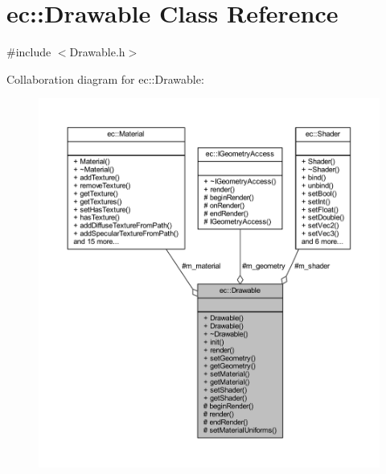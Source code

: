 \hypertarget{classec_1_1_drawable}{}\section{ec\+:\+:Drawable Class Reference}
\label{classec_1_1_drawable}


{\ttfamily \#include $<$Drawable.\+h$>$}



Collaboration diagram for ec\+:\+:Drawable\+:\nopagebreak
\begin{figure}[H]
\begin{center}
\leavevmode
\includegraphics[width=350pt]{classec_1_1_drawable__coll__graph}
\end{center}
\end{figure}
